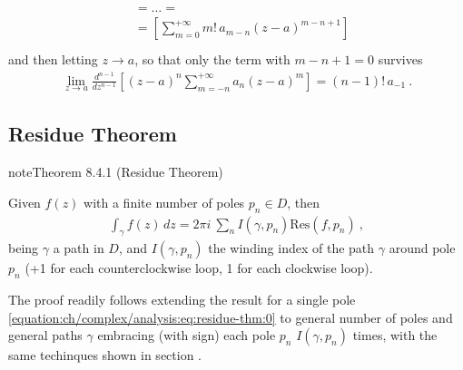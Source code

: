 \documentclass[letterpaper,10pt,english]{jupyterBook}
\begin{document}
\begin{itemize}
\begin{equation*}
\begin{split}
\begin{aligned}
    & = \dots = \\
    & = \left[ \sum_{m=0}^{+\infty} m! \, a_{m-n} (z-a)^{m-n+1} \right] \\
  \end{aligned}\end{split}
\end{equation*}
\sphinxAtStartPar
and then letting \(z \rightarrow a\), so that only the term with \(m-n+1 = 0\) survives
\begin{equation*}
\begin{split}\lim_{z \rightarrow a} \frac{d^{n-1}}{dz^{n-1}} \left[ (z-a)^n \sum_{m=-n}^{+\infty} a_n (z-a)^m \right] = (n-1)! \, a_{-1} \ .\end{split}
\end{equation*}
\end{itemize}


\subsection{Residue Theorem}
\label{\detokenize{ch/complex/analysis:residue-theorem}}\label{\detokenize{ch/complex/analysis:complex-analysis-mero-fun-residues-thm}}\label{ch/complex/analysis:theorem-6}
\begin{sphinxadmonition}{note}{Theorem 8.4.1 (Residue Theorem)}



\sphinxAtStartPar
Given \(f(z)\) with a finite number of poles \(p_n \in D\), then
\begin{equation*}
\begin{split}\int_{\gamma} f(z) \, dz = 2 \pi i \ \sum_{n} I(\gamma, p_n) \text{Res}(f,p_n) \ ,\end{split}
\end{equation*}
\sphinxAtStartPar
being \(\gamma\) a path in \(D\), and \(I(\gamma, p_n)\) the winding index of the path \(\gamma\) around pole \(p_n\) (+1 for each counter\sphinxhyphen{}clockwise loop, \sphinxhyphen{}1 for each clockwise loop).
\end{sphinxadmonition}

\sphinxAtStartPar
The proof readily follows extending the result for a single pole \eqref{equation:ch/complex/analysis:eq:residue-thm:0} to general number of poles and general paths \(\gamma\) embracing (with sign) each pole \(p_n\) \(I(\gamma,p_n)\) times, with the same techinques shown in section {\hyperref[\detokenize{ch/complex/analysis:complex-analysis-useful-int-path-independence-sum}]{}}.
\end{document}
